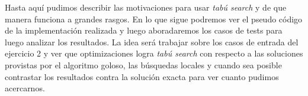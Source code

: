 Hasta aquí pudimos describir las motivaciones para usar \textit{tabú search} y de que manera funciona a grandes rasgos. En lo que sigue podremos ver el pseudo código de la implementación realizada y luego aboradaremos los casos de tests para luego analizar los resultados.  La idea será trabajar sobre los casos de entrada del ejercicio 2 y ver que optimizaciones logra \textit{tabú search} con respecto a las soluciones provistas por el algoritmo goloso, las búsquedas locales y cuando sea posible contrastar los resultados contra la solución exacta para ver cuanto pudimos acercarnos.
